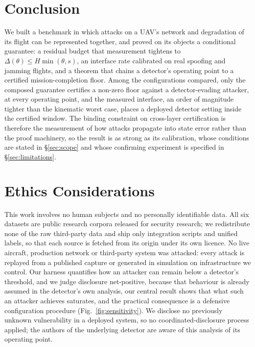 \section{Conclusion}
\label{sec:conclusion}
We built a benchmark in which attacks on a UAV's network and degradation of its
flight can be represented together, and proved on its objects a conditional
guarantee: a residual budget that measurement tightens to
$\Delta(\theta)\le H\min(\theta,s)$, an interface rate calibrated on real
spoofing and jamming flights, and a theorem that chains a detector's operating
point to a certified mission-completion floor. Among the configurations
compared, only the composed guarantee certifies a non-zero floor against a
detector-evading attacker, at every operating point, and the measured
interface, an order of magnitude tighter than the kinematic worst case, places
a deployed detector setting inside the certified window. The binding constraint
on cross-layer certification is therefore the measurement of how attacks
propagate into state error rather than the proof machinery, so the result is as
strong as its calibration, whose conditions are stated in \S\ref{sec:scope}
and whose confirming experiment is specified in \S\ref{sec:limitations}.

\section{Ethics Considerations}
\label{sec:ethics}
This work involves no human subjects and no personally identifiable data. All
six datasets are public research corpora released for security research; we
redistribute none of the raw third-party data and ship only integration scripts
and unified labels, so that each source is fetched from its origin under its own
licence. No live aircraft, production network or third-party system was
attacked: every attack is replayed from a published capture or generated in
simulation on infrastructure we control. Our harness quantifies how an attacker
can remain below a detector's threshold, and we judge disclosure net-positive,
because that behaviour is already assumed in the detector's own analysis, our
central result shows that what such an attacker achieves saturates, and the
practical consequence is a defensive configuration procedure
(Fig.~\ref{fig:sensitivity}). We disclose no previously unknown vulnerability
in a deployed system, so no coordinated-disclosure process applied; the authors
of the underlying detector are aware of this analysis of its operating point.

